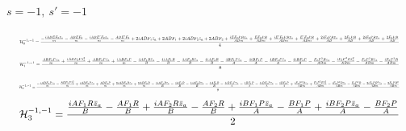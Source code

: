 \documentclass[10pt]{article}
\begin{document}
\paragraph{$s=-1,\ s'=-1$}
\begin{equation*}
\resizebox{0.98\textwidth}{!}{${\displaystyle \mathcal H^{-1,-1}_0=\frac{- \frac{i A B E F_2 \bar z_a}{m} - \frac{A B E F_2}{m} - \frac{i A B E' F_2 \bar z_a}{m} - \frac{A B E' F_2}{m} + 2 i A B F_1 \bar z_a + 2 A B F_1 + 2 i A B F_2 \bar z_a + 2 A B F_2 + \frac{i E F_2 P R \bar z_a}{A B m} + \frac{E F_2 P R}{A B m} + \frac{i E' F_2 P R \bar z_a}{A B m} + \frac{E' F_2 P R}{A B m} + \frac{2 i F_1 P R \bar z_a}{A B} + \frac{2 F_1 P R}{A B} + \frac{2 i F_2 P R \bar z_a}{A B} + \frac{2 F_2 P R}{A B}}{4}}$}
\end{equation*}
\begin{equation*}
\resizebox{0.98\textwidth}{!}{${\displaystyle \mathcal H^{-1,-1}_1=\frac{\frac{A B F_2 P z_a}{m} + \frac{i A B F_2 P \bar z_a^{2}}{m} + \frac{A B F_2 P \bar z_a}{m} + \frac{i A B F_2 P}{m} - \frac{4 A F_1 R \bar z_a}{B} - \frac{4 i A F_1 R}{B} - \frac{4 A F_2 R \bar z_a}{B} - \frac{4 i A F_2 R}{B} - \frac{4 B F_1 P \bar z_a}{A} - \frac{4 i B F_1 P}{A} - \frac{4 B F_2 P \bar z_a}{A} - \frac{4 i B F_2 P}{A} - \frac{F_2 P^{2} R z_a}{A B m} - \frac{i F_2 P^{2} R \bar z_a^{2}}{A B m} - \frac{F_2 P^{2} R \bar z_a}{A B m} - \frac{i F_2 P^{2} R}{A B m}}{8}}$}
\end{equation*}
\begin{equation*}
\resizebox{0.98\textwidth}{!}{${\displaystyle \mathcal H^{-1,-1}_2=\frac{- \frac{i A B F_2 P z_a}{m} - \frac{A B F_2 P \bar z_a^{2}}{m} + \frac{i A B F_2 P \bar z_a}{m} + \frac{A B F_2 P}{m} + \frac{2 i A B F_2 R \bar z_a}{m} + \frac{2 A B F_2 R}{m} - \frac{4 i A F_1 R \bar z_a}{B} - \frac{4 A F_1 R}{B} - \frac{4 i A F_2 R \bar z_a}{B} - \frac{4 A F_2 R}{B} - \frac{4 i B F_1 P \bar z_a}{A} - \frac{4 B F_1 P}{A} - \frac{4 i B F_2 P \bar z_a}{A} - \frac{4 B F_2 P}{A} + \frac{i F_2 P^{2} R z_a}{A B m} + \frac{F_2 P^{2} R \bar z_a^{2}}{A B m} - \frac{i F_2 P^{2} R \bar z_a}{A B m} - \frac{F_2 P^{2} R}{A B m} - \frac{2 i F_2 P R^{2} \bar z_a}{A B m} - \frac{2 F_2 P R^{2}}{A B m}}{8}}$}
\end{equation*}
\begin{equation*}
\resizebox{0.98\textwidth}{!}{${\displaystyle \mathcal H^{-1,-1}_3=\frac{\frac{i A F_1 R \bar z_a}{B} - \frac{A F_1 R}{B} + \frac{i A F_2 R \bar z_a}{B} - \frac{A F_2 R}{B} + \frac{i B F_1 P \bar z_a}{A} - \frac{B F_1 P}{A} + \frac{i B F_2 P \bar z_a}{A} - \frac{B F_2 P}{A}}{2}}$}
\end{equation*}
\end{document}
